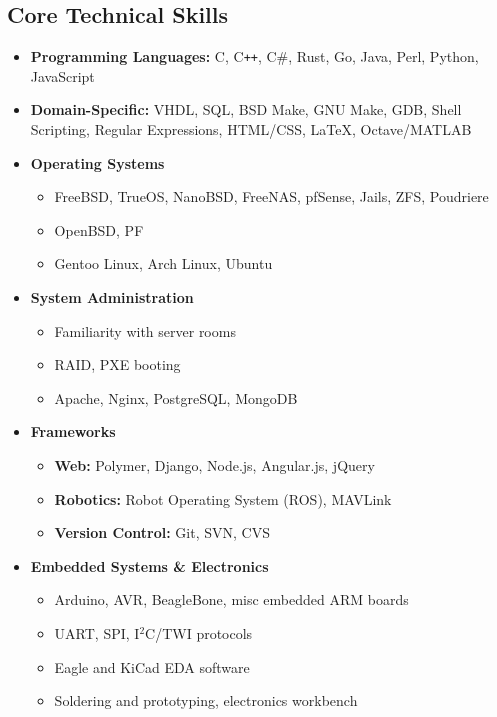 \documentclass[10pt,letterpaper]{article}
\begin{document}
\subsection*{Core Technical Skills}
\begin{itemize}
    \item \textbf{Programming Languages:} C, C\texttt{++}, C\#, Rust, Go, Java,
            Perl, Python, JavaScript
    \item \textbf{Domain-Specific:} VHDL, SQL, BSD Make, GNU Make, GDB, Shell
            Scripting, Regular Expressions, HTML/CSS, \LaTeX, Octave/MATLAB
    \item \textbf{Operating Systems}
        \begin{itemize}
            \item FreeBSD, TrueOS, NanoBSD, FreeNAS, pfSense, Jails, ZFS, Poudriere
            \item OpenBSD, PF
            \item Gentoo Linux, Arch Linux, Ubuntu
        \end{itemize}
    \item \textbf{System Administration}
        \begin{itemize}
            \item Familiarity with server rooms
            \item RAID, PXE booting
            \item Apache, Nginx, PostgreSQL, MongoDB
        \end{itemize}
    \item \textbf{Frameworks}
        \begin{itemize}
            \item \textbf{Web:} Polymer, Django, Node.js, Angular.js, jQuery
            \item \textbf{Robotics:} Robot Operating System (ROS), MAVLink
            \item \textbf{Version Control:} Git, SVN, CVS
        \end{itemize}
    \item \textbf{Embedded Systems \& Electronics}
        \begin{itemize}
            \item Arduino, AVR, BeagleBone, misc embedded ARM boards
            \item UART, SPI, I$^2$C/TWI protocols
            \item Eagle and KiCad EDA software
            \item Soldering and prototyping, electronics workbench

\end{itemize}
\end{itemize}
\end{document}
